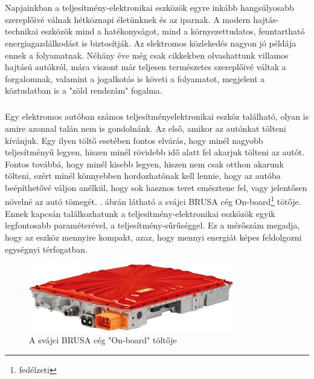 \chapter*{\bevezeto}

\paragraph{}
Napjainkban a teljesítmény-elektronikai eszközök egyre inkább hangsúlyosabb szereplőivé válnak hétköznapi életünknek és az iparnak. A modern hajtás-technikai eszközök mind a hatékonyságot, mind a környezettudatos, fenntartható energiagazdálkodást is biztosítják. Az elektromos közlekedés nagyon jó példája ennek a folyamatnak. Néhány éve még csak cikkekben olvashattunk villamos hajtású autókról, mára viszont már teljesen természetes szereplőivé váltak a forgalomnak, valamint a jogalkotás is követi a folyamatot, megjelent a köztudatban is a "zöld rendszám" fogalma. 

\paragraph{}
Egy elektromos autóban számos teljesítményelektronikai eszköz található, olyan is amire azonnal talán nem is gondolnánk. Az első, amikor az autónkat tölteni kívánjuk. Egy ilyen töltő esetében fontos elvárás, hogy minél nagyobb teljesítményű legyen, hiszen minél rövidebb idő alatt fel akarjuk tölteni az autót. Fontos továbbá, hogy minél kisebb legyen, hiszen nem csak otthon akarunk tölteni, ezért minél könnyebben hordozhatónak kell lennie, hogy az autóba beépíthetővé váljon anélkül, hogy sok hasznos teret emésztene fel, vagy jelentősen növelné az autó tömegét. . ábrán látható a svájci BRUSA cég On-board\footnote{fedélzeti} tötője. Ennek kapcsán találkozhatunk a  teljesítmény-elektronikai eszközök egyik legfontosabb paraméterével, a teljesítmény-sűrűséggel. Ez a mérőszám megadja, hogy az eszköz mennyire kompakt, azaz, hogy mennyi energiát képes feldolgozni egységnyi térfogatban.

\begin{figure}[!ht]
	\centering
	\includegraphics[width = 0.8\textwidth]{figures/brusa_charger.jpg}
	\caption{A svájci BRUSA cég "On-board" töltője} 
	\label{fig:brusa}
\end{figure}

